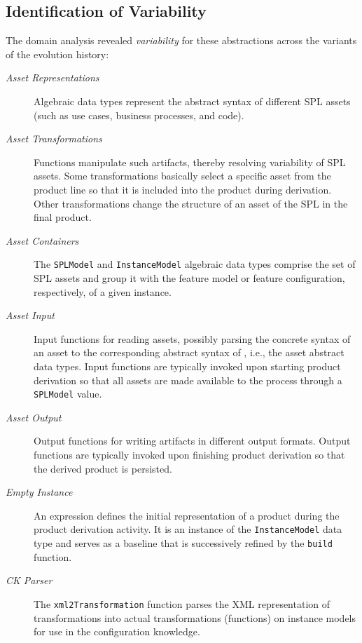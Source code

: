 
\subsection{Identification of Variability} 
\label{sec:variability}

The domain analysis revealed \emph{variability} for these abstractions across the variants of the evolution history:

\newcommand{\assetr}{\emph{Asset Representations}}
\newcommand{\assetx}{\emph{Asset Transformations}}
\newcommand{\asseti}{\emph{Asset Input}}
\newcommand{\asseto}{\emph{Asset Output}}
\newcommand{\assetc}{\emph{Asset Containers}}
\newcommand{\emptyi}{\emph{Empty Instance}}
\newcommand{\ckparser}{\emph{CK Parser}}

\begin{description}

\item[\assetr] Algebraic data types represent the abstract syntax of different SPL assets (such as use cases, business processes, and code).

\item[\assetx] Functions manipulate such artifacts, thereby resolving variability of SPL assets. Some transformations basically select a specific asset from the product line so that it is included into the product during derivation. Other transformations change the structure of an asset of the SPL in the final product.

\item[\assetc] The \texttt{SPLModel} and \texttt{InstanceModel} algebraic data types comprise the set of SPL assets and group it with the feature model or feature configuration, respectively, of a given \hpl{} instance.

\item[\asseti] Input functions for reading assets, possibly parsing the concrete syntax of an asset to the corresponding abstract syntax of \hpl{}, i.e., the asset abstract data types. Input functions are typically invoked upon starting product derivation so that all assets are made available to the process through a \texttt{SPLModel} value.

\item[\asseto] Output functions for writing artifacts in different output formats. Output functions are typically invoked upon finishing product derivation so that the derived product is persisted.

\item[\emptyi] An expression defines the initial representation of a product during the product derivation activity. It is an instance of the \texttt{InstanceModel} data type and serves as a baseline that is successively refined by the \texttt{build} function.

\item[\ckparser] The \texttt{xml2Transformation} function parses the XML representation of transformations into actual transformations (functions) on instance models for use in the configuration knowledge.

\end{description}

